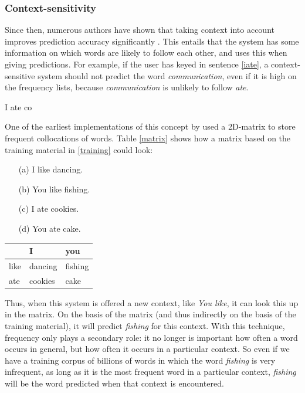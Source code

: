 \documentclass[12pt]{article}
\begin{document}
\subsubsection{Context-sensitivity}

Since then, numerous authors have shown that taking context into account improves prediction accuracy significantly \cite[among others]{Lesher+99,Garay-Vitoria+06,Tanaka-Ishii07,vandenbosch+08}. This entails that the system has some information on which words are likely to follow each other, and uses this when giving predictions. For example, if the user has keyed in sentence \ref{iate}, a context-sensitive system should not predict the word \emph{communication}, even if it is high on the frequency lists, because \emph{communication} is unlikely to follow \emph{ate}.

\begin{examples}
\item I ate co \label{iate}
\end{examples}

One of the earliest implementations of this concept by  used a 2D-matrix to store frequent collocations of words. Table \ref{matrix} shows how a matrix based on the training material in \ref{training} could look:

\begin{examples}

\item 

\begin{itemize} \label{training}
\item[(a)] I like dancing.
\item[(b)] You like fishing.
\item[(c)] I ate cookies.
\item[(d)] You ate cake.
\end{itemize}

\item \begin{tabular}{l|ll}
&I&you\\
\hline
like&dancing&fishing\\
ate&cookies&cake\\
\end{tabular} \label{matrix}

\end{examples}

Thus, when this system is offered a new context, like \emph{You like}, it can look this up in the matrix. On the basis of the matrix (and thus indirectly on the basis of the training material), it will predict \emph{fishing} for this context. With this technique, frequency only plays a secondary role: it no longer is important how often a word occurs in general, but how often it occurs in a particular context. So even if we have a training corpus of billions of words in which the word \emph{fishing} is very infrequent, as long as it is the most frequent word in a particular context, \emph{fishing} will be the word predicted when that context is encountered.
\end{document}

